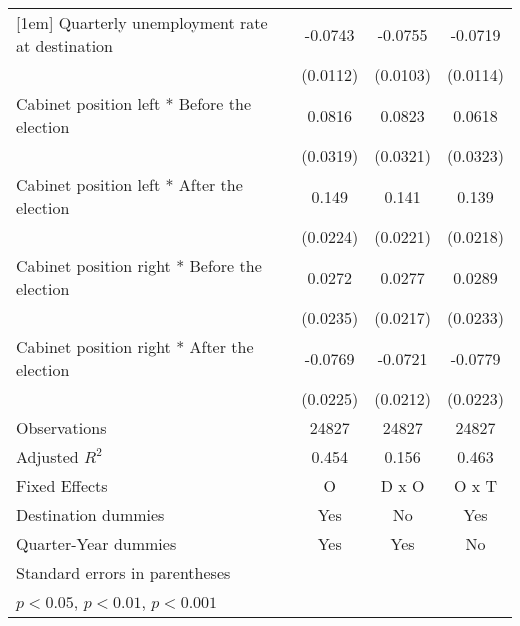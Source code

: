 \begin{table}[htbp]
\begin{tabular}{l*{3}{c}}
[1em]
Quarterly unemployment rate at destination&     -0.0743\sym{***}&     -0.0755\sym{***}&     -0.0719\sym{***}\\
                    &    (0.0112)         &    (0.0103)         &    (0.0114)         \\
[1em]
Cabinet position left * Before the election&      0.0816\sym{*}  &      0.0823\sym{*}  &      0.0618         \\
                    &    (0.0319)         &    (0.0321)         &    (0.0323)         \\
[1em]
Cabinet position left * After the election&       0.149\sym{***}&       0.141\sym{***}&       0.139\sym{***}\\
                    &    (0.0224)         &    (0.0221)         &    (0.0218)         \\
[1em]
Cabinet position right * Before the election&      0.0272         &      0.0277         &      0.0289         \\
                    &    (0.0235)         &    (0.0217)         &    (0.0233)         \\
[1em]
Cabinet position right * After the election&     -0.0769\sym{**} &     -0.0721\sym{**} &     -0.0779\sym{***}\\
                    &    (0.0225)         &    (0.0212)         &    (0.0223)         \\
\hline
Observations        &       24827         &       24827         &       24827         \\
Adjusted \(R^{2}\)  &       0.454         &       0.156         &       0.463         \\
Fixed Effects       &           O         &       D x O         &       O x T         \\
Destination dummies &         Yes         &          No         &         Yes         \\
Quarter-Year dummies&         Yes         &         Yes         &          No         \\
\hline\hline
\multicolumn{4}{l}{\footnotesize Standard errors in parentheses}\\
\multicolumn{4}{l}{\footnotesize \sym{*} \(p<0.05\), \sym{**} \(p<0.01\), \sym{***} \(p<0.001\)}\\
\end{tabular}
\end{table}
